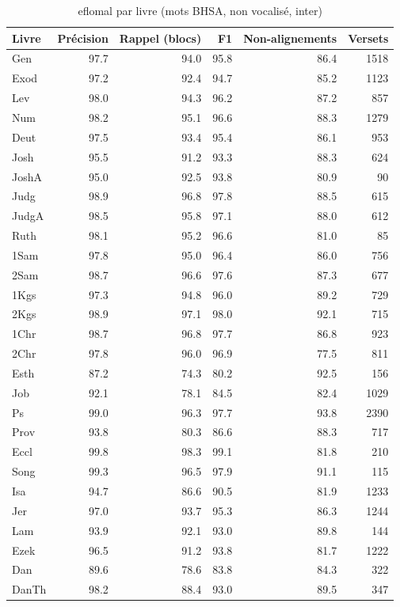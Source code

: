 \begin{table}[ht]
\centering
\caption{eflomal par livre (mots BHSA, non vocalisé, inter)}
\label{tab:eflomal_par_livre_mots_bhsa_non_vocalise_inter}
\begin{tabular}{lrrrrr}
\toprule
Livre & Précision & Rappel (blocs) & F1 & Non-alignements & Versets \\
\midrule
Gen & 97.7 & 94.0 & 95.8 & 86.4 & 1518 \\
Exod & 97.2 & 92.4 & 94.7 & 85.2 & 1123 \\
Lev & 98.0 & 94.3 & 96.2 & 87.2 & 857 \\
Num & 98.2 & 95.1 & 96.6 & 88.3 & 1279 \\
Deut & 97.5 & 93.4 & 95.4 & 86.1 & 953 \\
Josh & 95.5 & 91.2 & 93.3 & 88.3 & 624 \\
JoshA & 95.0 & 92.5 & 93.8 & 80.9 & 90 \\
Judg & 98.9 & 96.8 & 97.8 & 88.5 & 615 \\
JudgA & 98.5 & 95.8 & 97.1 & 88.0 & 612 \\
Ruth & 98.1 & 95.2 & 96.6 & 81.0 & 85 \\
1Sam & 97.8 & 95.0 & 96.4 & 86.0 & 756 \\
2Sam & 98.7 & 96.6 & 97.6 & 87.3 & 677 \\
1Kgs & 97.3 & 94.8 & 96.0 & 89.2 & 729 \\
2Kgs & 98.9 & 97.1 & 98.0 & 92.1 & 715 \\
1Chr & 98.7 & 96.8 & 97.7 & 86.8 & 923 \\
2Chr & 97.8 & 96.0 & 96.9 & 77.5 & 811 \\
Esth & 87.2 & 74.3 & 80.2 & 92.5 & 156 \\
Job & 92.1 & 78.1 & 84.5 & 82.4 & 1029 \\
Ps & 99.0 & 96.3 & 97.7 & 93.8 & 2390 \\
Prov & 93.8 & 80.3 & 86.6 & 88.3 & 717 \\
Eccl & 99.8 & 98.3 & 99.1 & 81.8 & 210 \\
Song & 99.3 & 96.5 & 97.9 & 91.1 & 115 \\
Isa & 94.7 & 86.6 & 90.5 & 81.9 & 1233 \\
Jer & 97.0 & 93.7 & 95.3 & 86.3 & 1244 \\
Lam & 93.9 & 92.1 & 93.0 & 89.8 & 144 \\
Ezek & 96.5 & 91.2 & 93.8 & 81.7 & 1222 \\
Dan & 89.6 & 78.6 & 83.8 & 84.3 & 322 \\
DanTh & 98.2 & 88.4 & 93.0 & 89.5 & 347 \\

\end{tabular}
\end{table}

